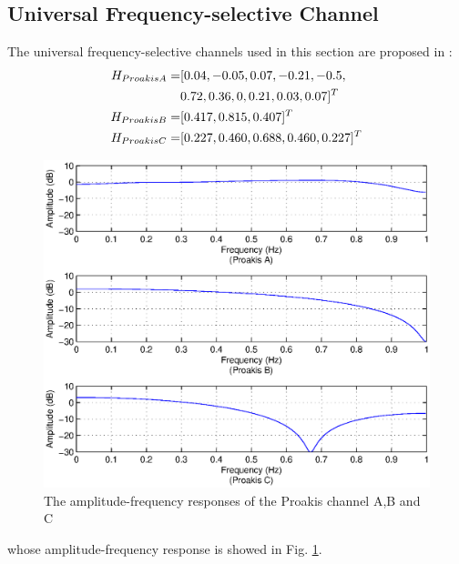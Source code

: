 \documentclass[conference]{IEEEtran}
\begin{document}
\subsection{Universal Frequency-selective Channel}
The universal frequency-selective channels used in this section are proposed in \cite{proakis}:
\begin{equation}
\begin{split}
H_{\mbox{\scriptsize Proakis A}}=&[0.04, -0.05, 0.07, -0.21, -0.5,\\ &0.72, 0.36, 0, 0.21, 0.03, 0.07]^T\\
H_{\mbox{\scriptsize Proakis B}}=&[0.417, 0.815, 0.407]^T\\
H_{\mbox{\scriptsize Proakis C}}=&[0.227, 0.460, 0.688, 0.460, 0.227]^T\\
\end{split}
\end{equation}
\begin{figure}[ht]
\centering
\includegraphics[width=\columnwidth]{PorakisBCchannelResponse.eps}
\caption{The amplitude-frequency responses of the Proakis channel A,B and C}
\label{fig_channel}
\end{figure}
whose amplitude-frequency response is showed in Fig. \ref{fig_channel}.
\end{document}
